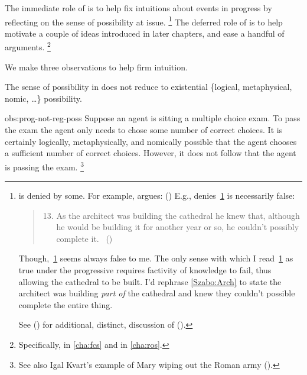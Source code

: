 \begin{note}
  The immediate role of \assuPP{} is to help fix intuitions about events in progress by reflecting on the sense of possibility at issue.%
  \footnote{
     is denied by some.
    For example, \citeauthor{Szabo:2004ul} argues:
    (\citeyear[40]{Szabo:2004ul})
    E.g., \citeauthor{Szabo:2004ul} denies~\ref{Szabo:Arch} is necessarily false:
    \begin{quote}
      \begin{enumerate}[label=(\arabic*), ref=(\arabic*)]
        \setcounter{enumi}{12}
      \item
        \label{Szabo:Arch}
        As the architect was building the cathedral he knew that, although he would be building it for another year or so, he couldn't possibly complete it.%
        \mbox{ }\hfill\mbox{(\citeyear[38]{Szabo:2004ul})}
      \end{enumerate}
    \end{quote}
    Though,~\ref{Szabo:Arch} seems always false to me.
    The only sense with which I read~\ref{Szabo:Arch} as true under the progressive requires factivity of knowledge to fail, thus allowing the cathedral to be built.
    I'd rephrase \autoref{Szabo:Arch} to state the architect was building \emph{part of} the cathedral and knew they couldn't possible complete the entire thing.

    See (\cite[1245]{Portner:2011vi}) for additional, distinct, discussion of (\cite{Szabo:2004ul}).
  }
  The deferred role of \assuPP{} is to help motivate a couple of ideas introduced in later chapters, and ease a handful of arguments.%
  \footnote{
    Specifically,  in \autoref{cha:fcs} and  in \autoref{cha:ros}.
  }

  We make three observations to help firm intuition.

  \begin{observation}%
    \label{obs:prog-not-reg-poss}%
    The sense of possibility in \assuPP{} does not reduce to existential \{logical, metaphysical, nomic, \dots\} possibility.
  \end{observation}
  \begin{motivation}{obs:prog-not-reg-poss}
    Suppose an agent is sitting a multiple choice exam.
    To pass the exam the agent only needs to chose some number of correct choices.
    It is certainly logically, metaphysically, and nomically possible that the agent chooses a sufficient number of correct choices.
    However, it does not follow that the agent is passing the exam.%
    \footnote{
      See also Igal Kvart's example of Mary wiping out the Roman army (\cite[18]{Landman:1992wh}).
    }
  \end{motivation}


\end{note}
